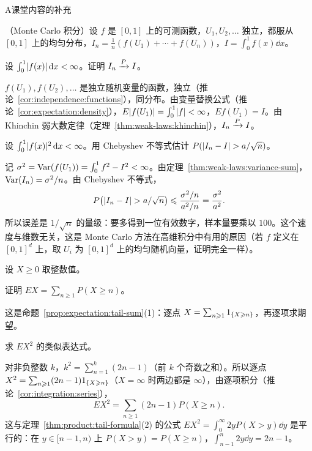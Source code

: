\begin{exercises}{A}{课堂内容的补充}
\item\label{ex:weak-laws:A3} （Monte Carlo 积分）设 $f$ 是 $[0,1]$ 上的可测函数，$U_1,U_2,\dots$ 独立，都服从 $[0,1]$ 上的均匀分布，$I_n=\frac1n(f(U_1)+\cdots+f(U_n))$，$I=\int_0^1f(x)\dd x$。
\begin{questions}
\item 设 $\int_0^1\lvert f(x)\rvert\,\mathrm{d} x<\infty$。证明 $I_n\xrightarrow{P} I$。
\begin{solution}
$f(U_1),f(U_2),\dots$ 是独立随机变量的函数，独立（推论~\ref{cor:independence:functions}），同分布。由变量替换公式（推论~\ref{cor:expectation:density}），$E\lvert f(U_1)\rvert=\int_0^1\lvert f\rvert<\infty$，$Ef(U_1)=I$。由 Khinchin 弱大数定律（定理~\ref{thm:weak-laws:khinchin}），$I_n\xrightarrow{P} I$。
\end{solution}
\item 设 $\int_0^1\lvert f(x)\rvert^2\,\mathrm{d} x<\infty$。用 Chebyshev 不等式估计 $P(\lvert I_n-I\rvert>a/\sqrt n)$。
\begin{solution}
记 $\sigma^2=\operatorname{Var}(f(U_1))=\int_0^1f^2-I^2<\infty$。由定理~\ref{thm:weak-laws:variance-sum}，$\operatorname{Var}(I_n)=\sigma^2/n$。由 Chebyshev 不等式，
\[
P\bigl(\lvert I_n-I\rvert>a/\sqrt n\bigr)\leqslant\frac{\sigma^2/n}{a^2/n}=\frac{\sigma^2}{a^2}.
\]
所以误差是 $1/\sqrt n$ 的量级：要多得到一位有效数字，样本量要乘以 $100$。这个速度与维数无关，这是 Monte Carlo 方法在高维积分中有用的原因（若 $f$ 定义在 $[0,1]^d$ 上，取 $U_i$ 为 $[0,1]^d$ 上的均匀随机向量，证明完全一样）。
\end{solution}
\end{questions}

\item\label{ex:weak-laws:A4} 设 $X\geqslant0$ 取整数值。
\begin{questions}
\item 证明 $EX=\sum_{n\geqslant1}P(X\geqslant n)$。
\begin{solution}
这是命题~\ref{prop:expectation:tail-sum}(1)：逐点 $X=\sum_{n\geqslant1}1_{\{X\geqslant n\}}$，再逐项求期望。
\end{solution}
\item 求 $EX^2$ 的类似表达式。
\begin{solution}
对非负整数 $k$，$k^2=\sum_{n=1}^k(2n-1)$（前 $k$ 个奇数之和）。所以逐点 $X^2=\sum_{n\geqslant1}(2n-1)1_{\{X\geqslant n\}}$（$X=\infty$ 时两边都是 $\infty$），由逐项积分（推论~\ref{cor:integration:series}），
\[
EX^2=\sum_{n\geqslant1}(2n-1)P(X\geqslant n).
\]
这与定理~\ref{thm:product:tail-formula}(2) 的公式 $EX^2=\int_0^\infty2yP(X>y)\dd y$ 是平行的：在 $y\in[n-1,n)$ 上 $P(X>y)=P(X\geqslant n)$，$\int_{n-1}^n2y\dd y=2n-1$。
\end{solution}
\end{questions}


\end{exercises}
